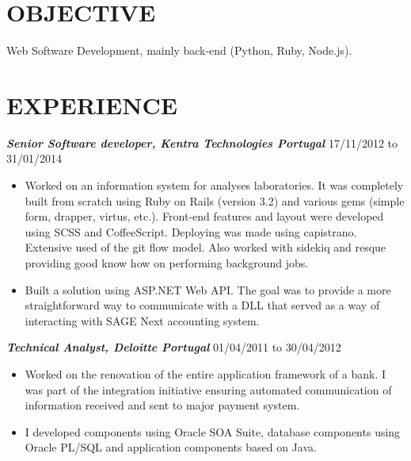 \documentclass[line,margin]{resume}
\begin{document}
\address{Currently living in Porto, Portugal}
\address{helder.tavares.silva@gmail.com or +351917534732}

\begin{resume}

\section{OBJECTIVE} Web Software Development, mainly back-end (Python, Ruby, Node.js).

\section{EXPERIENCE}
    {\sl\bf Senior Software developer, Kentra Technologies Portugal} \hfill 17/11/2012 to 31/01/2014
    \begin{itemize}  \itemsep -2pt %
        \item Worked on an information system for analyses laboratories. It was completely built from scratch using Ruby on Rails (version 3.2) and various gems (simple form, drapper, virtus, etc.). Front-end features and layout were developed using SCSS and CoffeeScript. Deploying was made using capistrano. Extensive used of the git flow model. Also worked with sidekiq and resque providing good know how on performing background jobs.
        \item Built a solution using ASP.NET Web API. The goal was to provide a more straightforward way to communicate with a DLL that served as a way of interacting with SAGE Next accounting system.
    \end{itemize}

    {\sl\bf Technical Analyst, Deloitte Portugal} \hfill 01/04/2011 to 30/04/2012
    \begin{itemize}  \itemsep -2pt %
        \item Worked on the renovation of the entire application framework of a bank. I was part of the integration initiative ensuring automated communication of information received and sent to major payment system.
        \item I developed components using Oracle SOA Suite, database components using Oracle PL/SQL and application components based on Java.
    \end{itemize}


\end{resume}
\end{document}
